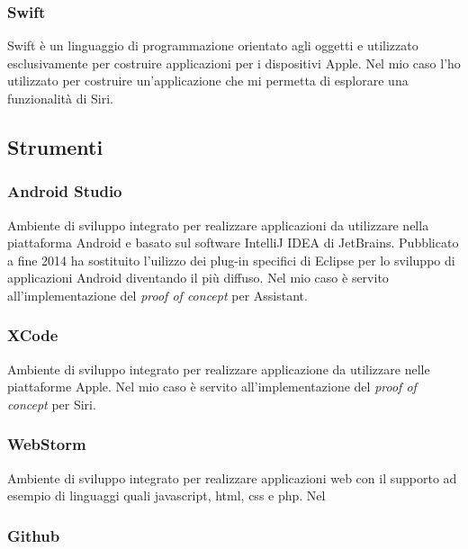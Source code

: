 		\subsubsection{Swift}
		Swift è un linguaggio di programmazione orientato agli oggetti e utilizzato esclusivamente per costruire applicazioni per i dispositivi Apple. Nel mio caso l'ho utilizzato per costruire un'applicazione che mi permetta di esplorare una funzionalità di Siri.
	\subsection{Strumenti}
		\subsubsection{Android Studio}
		Ambiente di sviluppo integrato per realizzare applicazioni da utilizzare nella piattaforma Android e basato sul software IntelliJ IDEA di JetBrains. Pubblicato a fine 2014 ha sostituito l'uilizzo dei plug-in specifici di Eclipse per lo sviluppo di applicazioni Android diventando il più diffuso. Nel mio caso è servito all'implementazione del \textit{proof of concept} per Assistant.
		\subsubsection{XCode}
		Ambiente di sviluppo integrato per realizzare applicazione da utilizzare nelle piattaforme Apple. Nel mio caso è servito all'implementazione del \textit{proof of concept} per Siri.
		\subsubsection{WebStorm}
		Ambiente di sviluppo integrato per realizzare applicazioni web con il supporto ad esempio di linguaggi quali javascript, html, css e php. Nel 
		\subsubsection{Github}


